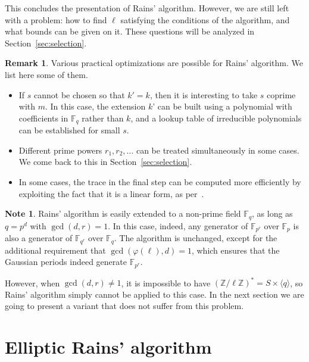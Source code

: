 \documentclass[12pt]{article}
\theoremstyle{plain}
\theoremstyle{definition}
\newtheorem*{remark}{Remark}
\newtheorem{note}[theorem]{Note}
\def\Z{\ensuremath{\mathbb{Z}}}
\def\F{\ensuremath{\mathbb{F}}}
\def\euler{\ensuremath{\varphi}}
\newcounter{algorithm}
\begin{document}
This concludes the presentation of Rains' algorithm. However, we are
still left with a problem: how to find $\ell$ satisfying the
conditions of the algorithm, and what bounds can be given on it. These
questions will be analyzed in Section~\ref{sec:selection}.

\begin{remark}
  Various practical optimizations are possible for Rains'
  algorithm. We list here some of them.
  \begin{itemize}
  \item If $s$ cannot be chosen so that $k'=k$, then it is interesting
    to take $s$ coprime with $m$. In this case, the extension $k$' can
    be built using a polynomial with coefficients in $\F_q$ rather
    than $k$, and a lookup table of irreducible polynomials can be
    established for small $s$.
  \item Different prime powers $r_1,r_2,\dots$ can be treated
    simultaneously in some cases. We come back to this in
    Section~\ref{sec:selection}.
  \item In some cases, the trace in the final step can be computed
    more efficiently by exploiting the fact that it is a linear form,
    as per~\cite{todo}.
  \end{itemize}
\end{remark}

\begin{note}
  \label{note:rains-non-prime}
  Rains' algorithm is easily extended to a non-prime field $\F_q$, as
  long as $q=p^d$ with $\gcd(d,r)=1$. In this case, indeed, any
  generator of $\F_{p^r}$ over $\F_p$ is also a generator of
  $\F_{q^r}$ over $\F_q$. The algorithm is unchanged, except for the
  additional requirement that $\gcd(\euler(\ell),d)=1$, which ensures
  that the Gaussian periods indeed generate $\F_{p^r}$.

  However, when $\gcd(d,r)\ne 1$, it is impossible to have
  $(\Z/\ell\Z)^\ast=S\times\langle q\rangle$, so Rains' algorithm
  simply cannot be applied to this case. In the next section we are
  going to present a variant that does not suffer from this problem.
\end{note}



\section{Elliptic Rains' algorithm}
\label{sec:rains-elliptic}
\end{document}
